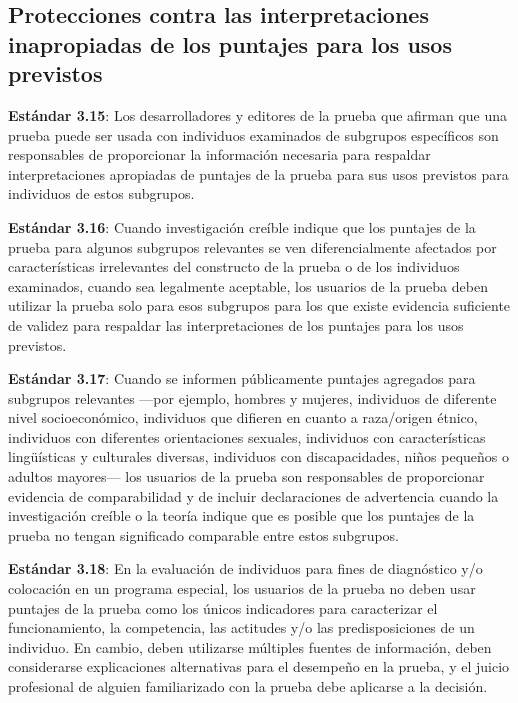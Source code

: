 \documentclass[
  letterpaper,
  DIV=11,
  numbers=noendperiod]{scrreprt}
\begin{document}
\subsection{Protecciones contra las interpretaciones inapropiadas de los
puntajes para los usos
previstos}\label{protecciones-contra-las-interpretaciones-inapropiadas-de-los-puntajes-para-los-usos-previstos}

\textbf{Estándar 3.15}: Los desarrolladores y editores de la prueba que
afirman que una prueba puede ser usada con individuos examinados de
subgrupos específicos son responsables de proporcionar la información
necesaria para respaldar interpretaciones apropiadas de puntajes de la
prueba para sus usos previstos para individuos de estos subgrupos.

\textbf{Estándar 3.16}: Cuando investigación creíble indique que los
puntajes de la prueba para algunos subgrupos relevantes se ven
diferencialmente afectados por características irrelevantes del
constructo de la prueba o de los individuos examinados, cuando sea
legalmente aceptable, los usuarios de la prueba deben utilizar la prueba
solo para esos subgrupos para los que existe evidencia suficiente de
validez para respaldar las interpretaciones de los puntajes para los
usos previstos.

\textbf{Estándar 3.17}: Cuando se informen públicamente puntajes
agregados para subgrupos relevantes ---por ejemplo, hombres y mujeres,
individuos de diferente nivel socioeconómico, individuos que difieren en
cuanto a raza/origen étnico, individuos con diferentes orientaciones
sexuales, individuos con características lingüísticas y culturales
diversas, individuos con discapacidades, niños pequeños o adultos
mayores--- los usuarios de la prueba son responsables de proporcionar
evidencia de comparabilidad y de incluir declaraciones de advertencia
cuando la investigación creíble o la teoría indique que es posible que
los puntajes de la prueba no tengan significado comparable entre estos
subgrupos.

\textbf{Estándar 3.18}: En la evaluación de individuos para fines de
diagnóstico y/o colocación en un programa especial, los usuarios de la
prueba no deben usar puntajes de la prueba como los únicos indicadores
para caracterizar el funcionamiento, la competencia, las actitudes y/o
las predisposiciones de un individuo. En cambio, deben utilizarse
múltiples fuentes de información, deben considerarse explicaciones
alternativas para el desempeño en la prueba, y el juicio profesional de
alguien familiarizado con la prueba debe aplicarse a la decisión.
\end{document}
